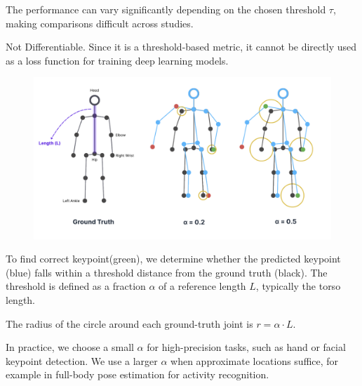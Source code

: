 {
\item The performance can vary significantly depending on the chosen threshold $\tau$, making comparisons difficult across
studies.
\item Not Differentiable. Since it is a threshold-based metric, it cannot be directly used as a loss function for training
deep learning models.
}
\clearpage

\begin{figure}[htbp]
    \centering
    \hspace*{-0.5cm}
    \includegraphics[width=1.1\textwidth]{figures/PCK_threshold_visual.png} %
    \label{fig:PCK_threshold}
\end{figure}

To find correct keypoint(green), we determine whether the predicted keypoint (blue) falls within a threshold distance from the ground truth (black).  
The threshold is defined as a fraction $\alpha$ of a reference length $L$, typically the torso length.  

The radius of the circle around each ground-truth joint is $r = \alpha \cdot L$.  

In practice, we choose a small $\alpha$ for high-precision tasks, such as hand or facial keypoint detection.  
We use a larger $\alpha$ when approximate locations suffice, for example in full-body pose estimation for activity recognition.


